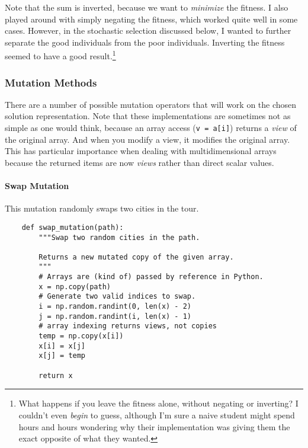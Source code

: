 \documentclass{article}
\begin{document}
Note that the sum is inverted, because we want to \textit{minimize} the fitness. I also played
around with simply negating the fitness, which worked quite well in some cases. However, in the
stochastic selection discussed below, I wanted to further separate the good individuals from the
poor individuals. Inverting the fitness seemed to have a good result.\footnote{What happens if you
    leave the fitness alone, without negating or inverting? I couldn't even \textit{begin} to
    guess, although I'm sure a naive student might spend hours and hours wondering why their
    implementation was giving them the exact opposite of what they wanted.}

\subsubsection{Mutation Methods}\label{sec:mutation-methods}
There are a number of possible mutation operators that will work on the chosen solution
representation. Note that these implementations are sometimes not as simple as one would think,
because an array access (\texttt{v = a[i]}) returns a \textit{view} of the original
array. And when you modify a view, it modifies the original array. This has particular importance
when dealing with multidimensional arrays because the returned items are now \textit{views} rather
than direct scalar values.

\paragraph{Swap Mutation} This mutation randomly swaps two cities in the tour.
\begin{verbatim}
    def swap_mutation(path):
        """Swap two random cities in the path.

        Returns a new mutated copy of the given array.
        """
        # Arrays are (kind of) passed by reference in Python.
        x = np.copy(path)
        # Generate two valid indices to swap.
        i = np.random.randint(0, len(x) - 2)
        j = np.random.randint(i, len(x) - 1)
        # array indexing returns views, not copies
        temp = np.copy(x[i])
        x[i] = x[j]
        x[j] = temp

        return x
\end{verbatim}
\end{document}
